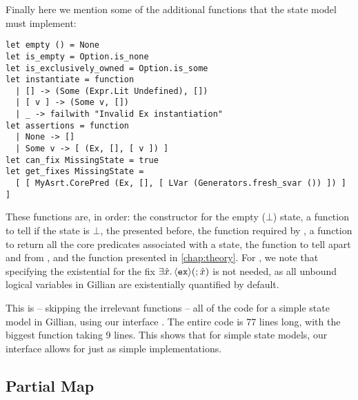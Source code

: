 Finally here we mention some of the additional functions that the state model must implement: \begin{lstlisting}
let empty () = None
let is_empty = Option.is_none
let is_exclusively_owned = Option.is_some
let instantiate = function
  | [] -> (Some (Expr.Lit Undefined), [])
  | [ v ] -> (Some v, [])
  | _ -> failwith "Invalid Ex instantiation"
let assertions = function
  | None -> []
  | Some v -> [ (Ex, [], [ v ]) ]
let can_fix MissingState = true
let get_fixes MissingState =
  [ [ MyAsrt.CorePred (Ex, [], [ LVar (Generators.fresh_svar ()) ]) ] ]
\end{lstlisting}
These functions are, in order: the constructor for the empty ($\bot$) state, a function to tell if the state is $\bot$, the \isexowned{} presented before, the  function required by \PMap, a function to return all the core predicates associated with a state, the function to tell apart \Err{} and \LFail{} from \Miss{}, and the \fix{} function presented in \cref{chap:theory}. For \fix, we note that specifying the existential for the fix $\exists\hat{x}\ldotp \left<\texttt{ex}\right>\!(;\hat{x})$ is not needed, as all unbound logical variables in Gillian are existentially quantified by default.

This is -- skipping the irrelevant functions -- all of the code for a simple state model in Gillian, using our interface . The entire code is 77 lines long, with the biggest function taking 9 lines. This shows that for simple state models, our interface allows for just as simple implementations.

\subsection{Partial Map}

